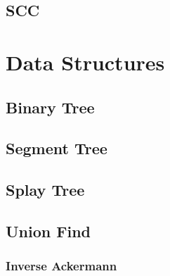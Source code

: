 \section{SCC}


\chapter{Data Structures}

\section{Binary Tree}


\section{Segment Tree}


\section{Splay Tree}


\section{Union Find}


\subsection{Inverse Ackermann}



